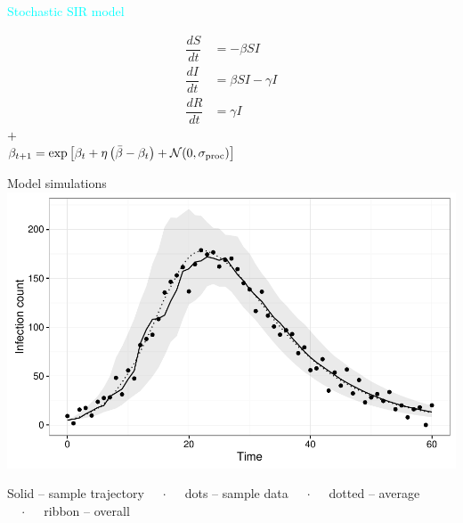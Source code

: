 \documentclass[12pt]{beamer}
\begin{document}
\begin{frame}

	\null
	{\large \textcolor{Cyan}{Stochastic SIR model}}
	\vfill

	\centering
	\begin{align*}
		\dfrac{dS}{dt} 	& = - \beta S I \\
		\dfrac{dI}{dt} 	& = \beta S I - \gamma I \\
		\dfrac{dR}{dt} 	& =  \gamma I
	\end{align*}
	\vspace{0.5\baselineskip}
	{\Large $+$}	\\
	\vspace{1\baselineskip}
	$\beta_{t+1} = \exp \left[ \beta_t + \eta \left( \bar{\beta} - \beta_t \right) + \mathcal{N}(0, \sigma_{\small\text{proc}}) \right]$

\end{frame}

\begin{frame}

	\null
	\large
	Model simulations \\
	\vspace{\baselineskip}
	\includegraphics[width=\textwidth,height=\textheight,keepaspectratio=true]{../../writing/SC1/images/sirmean}
	
	\vspace{0.5\baselineskip}
	\tiny
	\centering
	Solid -- sample trajectory $\quad\cdot\quad$ dots -- sample data $\quad\cdot\quad$ dotted -- average $\quad\cdot\quad$ ribbon -- overall

\end{frame}
\end{document}
